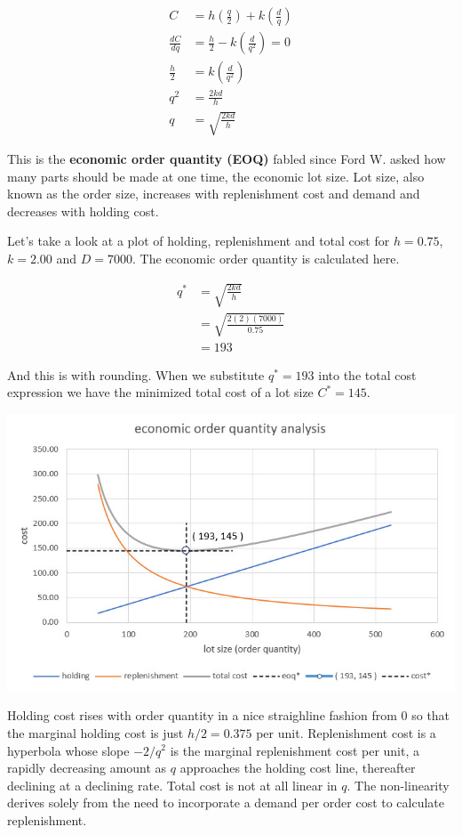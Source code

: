 \documentclass[
]{book}
\begin{document}
\[
\begin{align}
C &= h\left(\frac{q}{2}\right) + k\left(\frac{d}{q}\right) \\
\frac{dC}{dq} &= \frac{h}{2} - k\left(\frac{d}{q^{2}}\right) = 0\\
\frac{h}{2}   &= k\left(\frac{d}{q^{2}}\right) \\
q^2 &= \frac{2kd}{h} \\
q   &= \sqrt{\frac{2kd}{h}}
\end{align}
\]

This is the \textbf{economic order quantity (EOQ)} fabled since Ford W. \citet{Harris1913} asked how many parts should be made at one time, the economic lot size. Lot size, also known as the order size, increases with replenishment cost and demand and decreases with holding cost.

Let's take a look at a plot of holding, replenishment and total cost for \(h=0.75\), \(k=2.00\) and \(D=7000\). The economic order quantity is calculated here.

\[
\begin{align}
q^*   &= \sqrt{\frac{2kd}{h}} \\
      &= \sqrt{\frac{2(2)(7000)}{0.75}} \\
      &= 193
\end{align}
\]

And this is with rounding. When we substitute \(q^*=193\) into the total cost expression we have the minimized total cost of a lot size \(C^*=145\).

\includegraphics{images/04/eoq-graph.jpg}

Holding cost rises with order quantity in a nice straighline fashion from 0 so that the marginal holding cost is just \(h/2=0.375\) per unit. Replenishment cost is a hyperbola whose slope \(-2/q^2\) is the marginal replenishment cost per unit, a rapidly decreasing amount as \(q\) approaches the holding cost line, thereafter declining at a declining rate. Total cost is not at all linear in \(q\). The non-linearity derives solely from the need to incorporate a demand per order cost to calculate replenishment.
\end{document}
